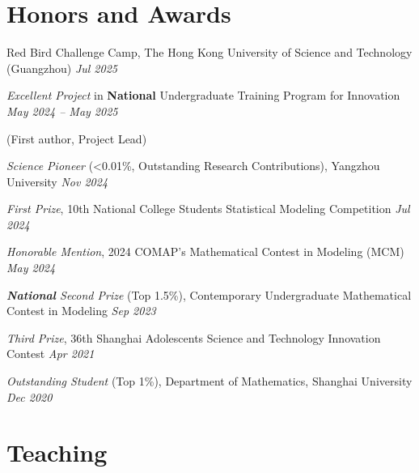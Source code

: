\documentclass[10pt, letterpaper]{article}
\begin{document}
   
        \section{Honors and Awards}
        


Red Bird Challenge Camp, The Hong Kong University of Science and Technology (Guangzhou)
\hfill \textit{Jul 2025}\\
\vspace{0.15 cm}


\textit{Excellent Project} in \textbf{National} Undergraduate Training Program for Innovation \hfill \textit{May 2024 – May 2025}

(First author, Project Lead) \\

\vspace{0.15 cm}

        

\textit{Science Pioneer} (<0.01\%, Outstanding Research Contributions), Yangzhou University \hfill \textit{Nov 2024}
\vspace{0.15 cm}



\textit{First Prize}, 10th National College Students Statistical Modeling Competition  
\hfill \textit{Jul 2024}\\
\vspace{0.15 cm}

\textit{Honorable Mention}, 2024 COMAP’s Mathematical Contest in Modeling (MCM)  
\hfill \textit{May 2024}\\
\vspace{0.15 cm}

\textit{\textbf{National} Second Prize} (Top 1.5\%), Contemporary Undergraduate Mathematical Contest in Modeling
\hfill \textit{Sep 2023}\\
\vspace{0.15 cm}

\textit{Third Prize}, 36th Shanghai Adolescents Science and Technology Innovation Contest
\hfill \textit{Apr 2021}\\
\vspace{0.15 cm}

\textit{Outstanding Student} (Top 1\%), Department of Mathematics, Shanghai University 
\hfill \textit{Dec 2020}\\



\section{Teaching}
\end{document}
